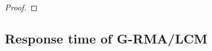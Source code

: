 \documentclass[conference]{IEEEtran}
\begin{document}
\begin{proof}

\end{proof}


\subsection{Response time of G-RMA/LCM}
\label{rma}
\end{document}
